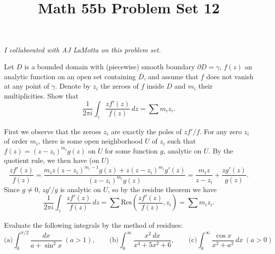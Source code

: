 \documentclass[11pt,letterpaper]{article}
\title{\textbf{Math 55b Problem Set 12}}
\begin{document}
\maketitle

\begin{center}
    \textit{I collaborated with AJ LaMotta on this problem set.}
\end{center}

\begin{problem}
    Let $D$ is a bounded domain with (piecewise) smooth boundary $\partial D=\gamma$, $f(z)$ an analytic function on an open set containing $\overline{D}$, and assume that $f$ does not vanish at any point of $\gamma$. Denote by $z_i$ the zeroes of $f$ inside $D$ and $m_i$ their multiplicities. Show that $$\frac{1}{2\pi i} \int_\gamma \frac{z f'(z)}{f(z)}\,dz=\sum m_iz_i.$$
\end{problem}

\begin{solution}
    First we observe that the zeroes $z_i$ are exactly the poles of $zf'/f$. For any zero $z_i$ of order $m_i $, there is some open neighborhood $U$ of $z_i$ such that $f(z)=(z-z_i)^{m_i}g(z)$ on $U$ for some function $g$, analytic on $U$. By the quotient rule, we then have (on $U$)
    \[
        \frac{zf'(z)}{f(z)} = \frac{m_i z(z-z_i)^{m_i-1}g(z)+z(z-z_i)^{m_i}g'(z)}{(z-z_i)^{m_i}g(z)}=\frac{m_i z}{z-z_i}+\frac{zg'(z)}{g(z)}.
    \] 
    Since $g\neq 0$, $zg'/g$ is analytic on $U$, so by the residue theorem we have
    \[
        \frac{1}{2\pi i}\int_\gamma \frac{zf'(z)}{f(z)}\,dz=\sum \textrm{Res}\left(\frac{zf'(z)}{f(z)}, z_i\right)=\sum m_i z_i.
    \] 
\end{solution}

\begin{problem}
    Evaluate the following integrals by the method of residues: $$\text{(a)} \int_0^{\pi/2} \frac{dx}{a+\sin^2 x}\ (a>1),\qquad \text{(b)} \int_0^\infty \frac{x^2\,dx}{x^4+5x^2+6},\qquad \text{(c)} \int_0^\infty \frac{\cos x}{x^2+a^2}\,dx\ (a>0)$$ 
\end{problem}
\end{document}
